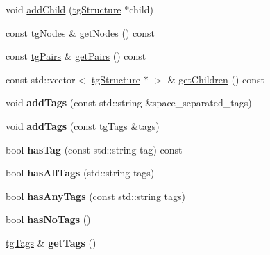 \begin{DoxyCompactItemize}
\item 
void \hyperlink{classtg_structure_a6e5d932f321fbe791c36430ec6a9f469}{add\-Child} (\hyperlink{classtg_structure}{tg\-Structure} $\ast$child)
\item 
const \hyperlink{classtg_nodes}{tg\-Nodes} \& \hyperlink{classtg_structure_aa9919228ba15532044cae964b13bc3cb}{get\-Nodes} () const 
\item 
const \hyperlink{classtg_pairs}{tg\-Pairs} \& \hyperlink{classtg_structure_a00a990b736f9e1e74879e2dc76935217}{get\-Pairs} () const 
\item 
const std\-::vector$<$ \hyperlink{classtg_structure}{tg\-Structure} $\ast$ $>$ \& \hyperlink{classtg_structure_afdc70c008e2a1112144fb0d7c37957db}{get\-Children} () const 
\item 
\hypertarget{classtg_taggable_af0b8f1729653b0b90d2fecbd51163612}{void {\bfseries add\-Tags} (const std\-::string \&space\-\_\-separated\-\_\-tags)}\label{classtg_taggable_af0b8f1729653b0b90d2fecbd51163612}

\item 
\hypertarget{classtg_taggable_af28e3fe1a7e4eb28772dc006d575dd1f}{void {\bfseries add\-Tags} (const \hyperlink{classtg_tags}{tg\-Tags} \&tags)}\label{classtg_taggable_af28e3fe1a7e4eb28772dc006d575dd1f}

\item 
\hypertarget{classtg_taggable_ae31f65869c8887bfeb34a344902c4d5b}{bool {\bfseries has\-Tag} (const std\-::string tag) const }\label{classtg_taggable_ae31f65869c8887bfeb34a344902c4d5b}

\item 
\hypertarget{classtg_taggable_a33b77b1075171b63f673965687b2e844}{bool {\bfseries has\-All\-Tags} (std\-::string tags)}\label{classtg_taggable_a33b77b1075171b63f673965687b2e844}

\item 
\hypertarget{classtg_taggable_af14af28fa98021c4f20a5e8f2ddd5606}{bool {\bfseries has\-Any\-Tags} (const std\-::string tags)}\label{classtg_taggable_af14af28fa98021c4f20a5e8f2ddd5606}

\item 
\hypertarget{classtg_taggable_adff345e116e16420c701a748ff8f995f}{bool {\bfseries has\-No\-Tags} ()}\label{classtg_taggable_adff345e116e16420c701a748ff8f995f}

\item 
\hypertarget{classtg_taggable_acf1d7fa9df8f374f25015c4080902681}{\hyperlink{classtg_tags}{tg\-Tags} \& {\bfseries get\-Tags} ()}\label{classtg_taggable_acf1d7fa9df8f374f25015c4080902681}


\end{DoxyCompactItemize}
